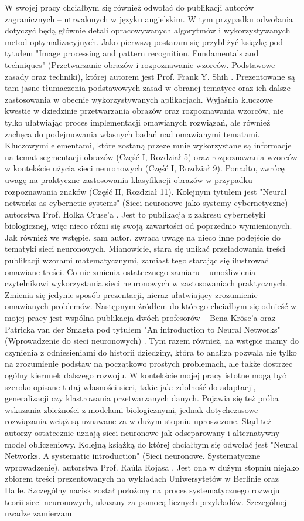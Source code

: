 W swojej pracy chciałbym się również odwołać do publikacji autorów zagranicznych -- utrwalonych w języku angielskim. W tym przypadku odwołania dotyczyć będą głównie detali opracowywanych algorytmów i wykorzystywanych metod optymalizacyjnych. Jako pierwszą postaram się przybliżyć książkę pod tytułem "Image processing and pattern recognition. Fundamentals and techniques" (Przetwarzanie obrazów i rozpoznawanie wzorców. Podstawowe zasady oraz techniki), której autorem jest Prof. Frank Y. Shih \cite{Shi10}. Prezentowane są tam jasne tłumaczenia podstawowych zasad w obranej tematyce oraz ich dalsze zastosowania w obecnie wykorzystywanych aplikacjach. Wyjaśnia kluczowe kwestie w dziedzinie przetwarzania obrazów oraz rozpoznawania wzorców, nie tylko ułatwiając proces implementacji omawianych rozwiązań, ale również zachęca do podejmowania własnych badań nad omawianymi tematami. Kluczowymi elementami, które zostaną przeze mnie wykorzystane są informacje na temat segmentacji obrazów (Część I, Rozdział 5) oraz rozpoznawania wzorców w kontekście użycia sieci neuronowych (Część I, Rozdział 9). Ponadto, zwrócę uwagę na praktyczne zastosowania klasyfikacji obrazów w przypadku rozpoznawania znaków (Część II, Rozdział 11). Kolejnym tytułem jest "Neural networks as cybernetic systems" (Sieci neuronowe jako systemy cybernetyczne) autorstwa Prof. Holka Cruse'a \cite{Cru06}. Jest to publikacja z zakresu cybernetyki biologicznej, więc nieco różni się swoją zawartości od poprzednio wymienionych. Jak również we wstępie, sam autor, zwraca uwagę na nieco inne podejście do tematyki sieci neuronowych. Mianowicie, stara się unikać przeładowania treści publikacji wzorami matematycznymi, zamiast tego starając się ilustrować omawiane treści. Co nie zmienia ostatecznego zamiaru -- umożliwienia czytelnikowi wykorzystania sieci neuronowych w zastosowaniach praktycznych. Zmienia się jedynie sposób prezentacji, nieraz ułatwiający zrozumienie omawianych problemów. Następnym źródłem do którego chciałbym się odnieść w mojej pracy jest wspólna publikacja dwóch profesorów -- Bena Kröse'a oraz Patricka van der Smagta pod tytułem "An introduction to Neural Networks" (Wprowadzenie do sieci neuronowych) \cite{KaS96}. Tym razem również, na wstępie mamy do czynienia z odniesieniami do historii dziedziny, która to analiza pozwala nie tylko na zrozumienie podstaw na początkowo prostych problemach, ale także dostrzec ogólny kierunek dalszego rozwoju. W kontekście mojej pracy istotne mogą być szeroko opisane tutaj własności sieci, takie jak: zdolność do adaptacji, generalizacji czy klastrowania przetwarzanych danych. Pojawia się też próba wskazania zbieżności z modelami biologicznymi, jednak dotychczasowe rozwiązania wciąż są uznawane za w dużym stopniu uproszczone. Stąd też autorzy ostatecznie uznają sieci neuronowe jak odseparowany i alternatywny model obliczeniowy. Kolejną książką do której chciałbym się odwołać jest "Neural Networks. A systematic introduction" (Sieci neuronowe. Systematyczne wprowadzenie), autorstwa Prof. Raúla Rojasa \cite{Roj96}. Jest ona w dużym stopniu niejako zbiorem treści prezentowanych na wykładach Uniwersytetów w Berlinie oraz Halle. Szczególny nacisk został położony na proces systematycznego rozwoju teorii sieci neuronowych, ukazany za pomocą licznych przykładów. Szczególnej uwadze zamierzam 